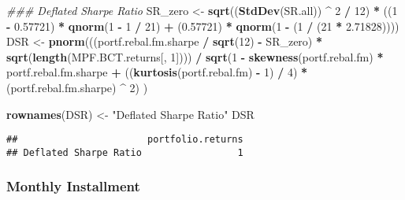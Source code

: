 \documentclass[
]{article}
\newenvironment{Shaded}{\begin{snugshade}}{\end{snugshade}}
\newcommand{\CommentTok}[1]{\textcolor[rgb]{0.56,0.35,0.01}{\textit{#1}}}
\newcommand{\DecValTok}[1]{\textcolor[rgb]{0.00,0.00,0.81}{#1}}
\newcommand{\FloatTok}[1]{\textcolor[rgb]{0.00,0.00,0.81}{#1}}
\newcommand{\KeywordTok}[1]{\textcolor[rgb]{0.13,0.29,0.53}{\textbf{#1}}}
\newcommand{\NormalTok}[1]{#1}
\newcommand{\OperatorTok}[1]{\textcolor[rgb]{0.81,0.36,0.00}{\textbf{#1}}}
\newcommand{\StringTok}[1]{\textcolor[rgb]{0.31,0.60,0.02}{#1}}
\begin{document}
\begin{Shaded}
\begin{Highlighting}[]
\CommentTok{### Deflated Sharpe Ratio}
\NormalTok{SR_zero <-}
\StringTok{  }\KeywordTok{sqrt}\NormalTok{((}\KeywordTok{StdDev}\NormalTok{(SR.all)) }\OperatorTok{^}\StringTok{ }\DecValTok{2} \OperatorTok{/}\StringTok{ }\DecValTok{12}\NormalTok{) }\OperatorTok{*}\StringTok{ }\NormalTok{((}\DecValTok{1} \OperatorTok{-}\StringTok{ }\FloatTok{0.57721}\NormalTok{) }\OperatorTok{*}\StringTok{ }\KeywordTok{qnorm}\NormalTok{(}\DecValTok{1} \OperatorTok{-}\StringTok{ }\DecValTok{1} \OperatorTok{/}\StringTok{ }\DecValTok{21}\NormalTok{) }\OperatorTok{+}
\StringTok{                                       }\NormalTok{(}\FloatTok{0.57721}\NormalTok{) }\OperatorTok{*}\StringTok{ }\KeywordTok{qnorm}\NormalTok{(}\DecValTok{1} \OperatorTok{-}\StringTok{ }\NormalTok{(}\DecValTok{1} \OperatorTok{/}\StringTok{ }\NormalTok{(}\DecValTok{21} \OperatorTok{*}\StringTok{ }\FloatTok{2.71828}\NormalTok{))))}
\NormalTok{DSR <-}
\StringTok{  }\KeywordTok{pnorm}\NormalTok{(((portf.rebal.fm.sharpe }\OperatorTok{/}\StringTok{ }\KeywordTok{sqrt}\NormalTok{(}\DecValTok{12}\NormalTok{) }\OperatorTok{-}\StringTok{ }\NormalTok{SR_zero) }\OperatorTok{*}\StringTok{ }\KeywordTok{sqrt}\NormalTok{(}\KeywordTok{length}\NormalTok{(MPF.BCT.returns[, }\DecValTok{1}\NormalTok{]))) }\OperatorTok{/}
\StringTok{          }\KeywordTok{sqrt}\NormalTok{(}\DecValTok{1} \OperatorTok{-}\StringTok{ }\KeywordTok{skewness}\NormalTok{(portf.rebal.fm) }\OperatorTok{*}\StringTok{ }\NormalTok{portf.rebal.fm.sharpe }\OperatorTok{+}\StringTok{ }
\StringTok{                 }\NormalTok{((}\KeywordTok{kurtosis}\NormalTok{(portf.rebal.fm) }\OperatorTok{-}\StringTok{ }\DecValTok{1}\NormalTok{) }\OperatorTok{/}\StringTok{ }\DecValTok{4}\NormalTok{) }\OperatorTok{*}\StringTok{ }\NormalTok{(portf.rebal.fm.sharpe) }\OperatorTok{^}\StringTok{ }\DecValTok{2}\NormalTok{)}
\NormalTok{  )}

\KeywordTok{rownames}\NormalTok{(DSR) <-}\StringTok{ "Deflated Sharpe Ratio"}
\NormalTok{DSR}
\end{Highlighting}
\end{Shaded}

\begin{verbatim}
##                       portfolio.returns
## Deflated Sharpe Ratio                 1
\end{verbatim}

\hypertarget{monthly-installment}{%
\subsubsection{Monthly Installment}\label{monthly-installment}}
\end{document}
